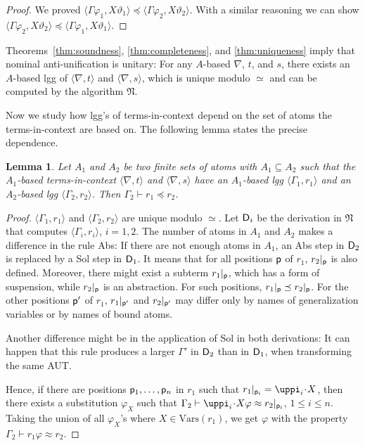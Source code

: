 \documentclass[11pt,a4paper]{amsart}
\newtheorem{lemma}{Lemma}
\theoremstyle{definition}
\newcommand{\vars}{\mathrm{Vars}}
\newcommand{\frN}{\mathfrak N}
\newcommand{\permap}{{\mkern 1mu\cdot \mkern 1mu}}
\newcommand\pos{{\sf p}}
\newcommand\ppi{\uppi}
\newcommand{\np}[2]{\langle #1, \allowbreak #2\rangle}
\begin{document}
\begin{proof}
We proved $\np{\Gamma\varphi_1}{X\vartheta_1} \preceq \np{\Gamma\varphi_2}{X\vartheta_2}$. With a similar reasoning we can show $\np{\Gamma\varphi_2}{X\vartheta_2} \preceq \np{\Gamma\varphi_1}{X\vartheta_1}$.
\end{proof}

Theorems~\ref{thm:soundness}, \ref{thm:completeness}, and \ref{thm:uniqueness} imply that nominal anti-unification is unitary: For any $A$-based $\nabla$, $t$, and $s$, there exists an $A$-based lgg of $\np{\nabla}{t}$ and $\np{\nabla}{s}$, which is unique modulo $\simeq$ and can be computed by the algorithm $\frN$. 

Now we study how lgg's of terms-in-context depend on the set of atoms the terms-in-context are based on. The following lemma states the precise dependence.

 \begin{lemma}
    \label{lemma:subset:gen}
    Let $A_1$ and $A_2$ be two finite sets of atoms with $A_1\subseteq A_2$
    such that the $A_1$-based terms-in-context $\np{\nabla}{t}$ and
    $\np{\nabla}{s}$ have an $A_1$-based lgg $\np{\Gamma_1}{r_1}$ and
    an $A_2$-based lgg $\np{\Gamma_2}{r_2}$. Then $\Gamma_2\vdash r_1\preceq r_2$.
  \end{lemma}


\begin{proof}
$\np{\Gamma_1}{r_1}$ and $\np{\Gamma_2}{r_2}$ are unique modulo $\simeq$. Let ${\sf D}_i$  be the derivation in $\frN$ that computes $\np{\Gamma_i}{r_i}$, $i=1,2$. The number of atoms in $A_1$ and $A_2$ makes a difference in the rule \textsf{Abs}: If there are not enough atoms in $A_1$, an \textsf{Abs} step in ${\sf D}_2$ is replaced by a \textsf{Sol} step in ${\sf D}_1$. It means that for all positions $\pos$ of $r_1$, $r_2|_\pos$ is also defined. Moreover, there might exist a subterm $r_1|_\pos$, which has a form of suspension, while $r_2|_\pos$ is an abstraction. For such positions, $r_1|_\pos\preceq r_2|_\pos$. For the other positions $\pos'$ of $r_1$, $r_1|_{\pos'}$ and $r_2|_{\pos'}$ may differ only by names of generalization variables or by names of bound atoms.

Another difference might be in the application of \textsf{Sol} in both derivations: It can happen that this rule produces a larger $\Gamma'$ in ${\sf D}_2$ than in ${\sf D}_1$, when transforming the same AUT. 

Hence, if there are positions $\pos_1,\ldots,\pos_n$ in $r_1$ such that $r_1|_{\pos_i}=\ppi_i\permap X$, then there exists a substitution $\varphi_X$ such that $\Gamma_2\vdash \ppi_i \permap X\varphi \approx r_2|_{\pos_i}$, $1\le i \le n $. Taking the union of all $\varphi_X$'s where $X\in \vars(r_1)$, we get $\varphi$ with the property $\Gamma_2 \vdash r_1\varphi \approx r_2$. 
\end{proof}
\end{document}
